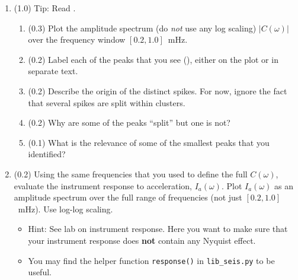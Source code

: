\documentclass[11pt,titlepage,fleqn]{article}
\newcommand{\tfileresponse}{{\tt hw\_sumatraA\_CAN\_response.ipynb}}
\begin{document}
\begin{enumerate}
\begin{enumerate}
Tip: Use \verb+markp_minutes+, which is provided as a commented section in 

\tfileresponse\ to get the period associated with any peak.


\item (0.1) What is the maximum allowable frequency and why?
\item (0.1) What is the minimum (non-zero) allowable frequency and why? \\
What is the corresponding period?
\end{enumerate}


\item (1.0) Tip: Read \citet{Park2005}.

\begin{enumerate}
\item (0.3) Plot the amplitude spectrum (do {\em not} use any log scaling) $|C(\omega)|$ over the frequency window $[0.2,1.0]$~mHz.
\item (0.2) Label each of the peaks that you see (\eg {}), either on the plot or in separate text.

\item (0.2) Describe the origin of the distinct spikes. For now, ignore the fact that several spikes are split within clusters.

\item (0.2) Why are some of the peaks ``split'' but one is not?

\item (0.1) What is the relevance of some of the smallest peaks that you identified?
\end{enumerate}


\item (0.2) Using the same frequencies that you used to define the full $C(\omega)$, evaluate the instrument response to acceleration, $I_a(\omega)$. Plot $I_a(\omega)$ as an amplitude spectrum over the full range of frequencies (not just $[0.2,1.0]$~mHz). Use log-log scaling.

\begin{itemize}
\item Hint: See lab on instrument response. Here you want to make sure that your instrument response does {\bf not} contain any Nyquist effect.
\item You may find the helper function \verb+response()+ in \verb+lib_seis.py+ to be useful.
\end{itemize}


\end{enumerate}
\end{document}
